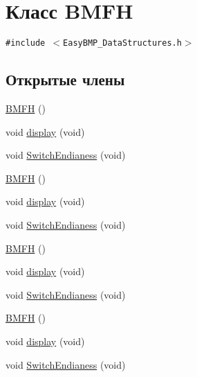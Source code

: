 \hypertarget{class_b_m_f_h}{
\section{Класс BMFH}
\label{class_b_m_f_h}
}
{\tt \#include $<$EasyBMP\_\-DataStructures.h$>$}

\subsection*{Открытые члены}
\begin{CompactItemize}
\item 
\hyperlink{class_b_m_f_h_fde965142b7c9c4f358175c2438e8668}{BMFH} ()
\item 
void \hyperlink{class_b_m_f_h_66ce85f14dfc812a2692a227af6cb225}{display} (void)
\item 
void \hyperlink{class_b_m_f_h_749e4bb6cfa10ed9fa77c3578c471110}{SwitchEndianess} (void)
\item 
\hyperlink{class_b_m_f_h_fde965142b7c9c4f358175c2438e8668}{BMFH} ()
\item 
void \hyperlink{class_b_m_f_h_66ce85f14dfc812a2692a227af6cb225}{display} (void)
\item 
void \hyperlink{class_b_m_f_h_749e4bb6cfa10ed9fa77c3578c471110}{SwitchEndianess} (void)
\item 
\hyperlink{class_b_m_f_h_fde965142b7c9c4f358175c2438e8668}{BMFH} ()
\item 
void \hyperlink{class_b_m_f_h_66ce85f14dfc812a2692a227af6cb225}{display} (void)
\item 
void \hyperlink{class_b_m_f_h_749e4bb6cfa10ed9fa77c3578c471110}{SwitchEndianess} (void)
\item 
\hyperlink{class_b_m_f_h_fde965142b7c9c4f358175c2438e8668}{BMFH} ()
\item 
void \hyperlink{class_b_m_f_h_66ce85f14dfc812a2692a227af6cb225}{display} (void)
\item 
void \hyperlink{class_b_m_f_h_749e4bb6cfa10ed9fa77c3578c471110}{SwitchEndianess} (void)
\end{CompactItemize}
